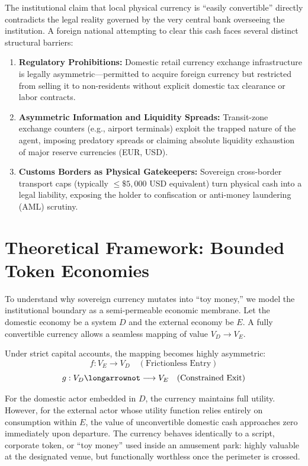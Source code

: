 \documentclass[reprint,amsmath,amssymb,aps,prd,showkeys]{revtex4-2}
\begin{document}
The institutional claim that local physical currency is ``easily convertible'' directly contradicts the legal reality governed by the very central bank overseeing the institution. A foreign national attempting to clear this cash faces several distinct structural barriers:
\begin{enumerate}
\item \textbf{Regulatory Prohibitions:} Domestic retail currency exchange infrastructure is legally asymmetric---permitted to acquire foreign currency but restricted from selling it to non-residents without explicit domestic tax clearance or labor contracts.
\item \textbf{Asymmetric Information and Liquidity Spreads:} Transit-zone exchange counters (e.g., airport terminals) exploit the trapped nature of the agent, imposing predatory spreads or claiming absolute liquidity exhaustion of major reserve currencies (EUR, USD).
\item \textbf{Customs Borders as Physical Gatekeepers:} Sovereign cross-border transport caps (typically $\le \$5,000$ USD equivalent) turn physical cash into a legal liability, exposing the holder to confiscation or anti-money laundering (AML) scrutiny.
\end{enumerate}

\section{Theoretical Framework: Bounded Token Economies}
To understand why sovereign currency mutates into ``toy money,'' we model the institutional boundary as a semi-permeable economic membrane. Let the domestic economy be a system $D$ and the external economy be $E$. A fully convertible currency allows a seamless mapping of value $V_D \rightarrow V_E$.

Under strict capital accounts, the mapping becomes highly asymmetric:
\begin{equation}
f: V_E \longrightarrow V_D \quad (\text{Frictionless Entry})
\end{equation}
\begin{equation}
g: V_D \longarrownot\longrightarrow V_E \quad (\text{Constrained Exit})
\end{equation}

For the domestic actor embedded in $D$, the currency maintains full utility. However, for the external actor whose utility function relies entirely on consumption within $E$, the value of unconvertible domestic cash approaches zero immediately upon departure. The currency behaves identically to a script, corporate token, or ``toy money'' used inside an amusement park: highly valuable at the designated venue, but functionally worthless once the perimeter is crossed.
\end{document}
